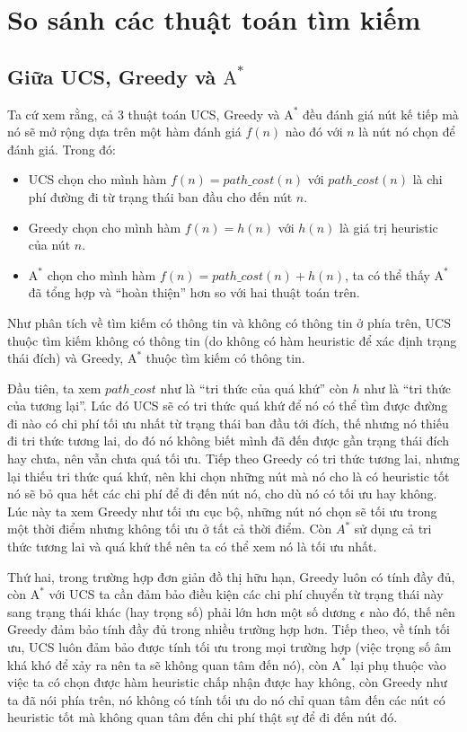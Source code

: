 \chapter{So sánh các thuật toán tìm kiếm}

\section{Giữa UCS, Greedy và $\text{A}^*$}

Ta cứ xem rằng, cả 3 thuật toán UCS, Greedy và $\text{A}^*$ đều đánh giá nút kế tiếp mà nó sẽ mở rộng dựa trên một hàm đánh giá $f(n)$ nào đó với $n$ là nút nó chọn để đánh giá. Trong đó:
\begin{itemize}
    \item UCS chọn cho mình hàm $f(n) = path\_cost(n)$ với $path\_cost(n)$ là chi phí đường đi từ trạng thái ban đầu cho đến nút $n$.
    \item Greedy chọn cho mình hàm $f(n) = h(n)$ với $h(n)$ là giá trị heuristic của nút $n$.
    \item $\text{A}^*$ chọn cho mình hàm $f(n) = path\_cost(n) + h(n)$, ta có thể thấy $\text{A}^*$ đã tổng hợp và ``hoàn thiện'' hơn so với hai thuật toán trên.
\end{itemize}

Như phân tích về tìm kiếm có thông tin và không có thông tin ở phía trên, UCS thuộc tìm kiếm không có thông tin (do không có hàm heuristic để xác định trạng thái đích) và Greedy, $\text{A}^*$ thuộc tìm kiếm có thông tin.
\vspace{7pt}

Đầu tiên, ta xem $path\_cost$ như là ``tri thức của quá khứ'' còn $h$ như là ``tri thức của tương lại''. Lúc đó UCS sẽ có tri thức quá khứ để nó có thể tìm được đường đi nào có chi phí tối ưu nhất từ trạng thái ban đầu tới đích, thế nhưng nó thiếu đi tri thức tương lai, do đó nó không biết mình đã đến được gần trạng thái đích hay chưa, nên vẫn chưa quá tối ưu. Tiếp theo Greedy có tri thức tương lai, nhưng lại thiếu tri thức quá khứ, nên khi chọn những nút mà nó cho là có heuristic tốt nó sẽ bỏ qua hết các chi phí để đi đến nút nó, cho dù nó có tối ưu hay không. Lúc này ta xem Greedy như tối ưu cục bộ, những nút nó chọn sẽ tối ưu trong một thời điểm nhưng không tối ưu ở tất cả thời điểm. Còn $A^*$ sử dụng cả tri thức tương lai và quá khứ thế nên ta có thể xem nó là tối ưu nhất.
\vspace{7pt}

Thứ hai, trong trường hợp đơn giản đồ thị hữu hạn, Greedy luôn có tính đầy đủ, còn $\text{A}^*$ với UCS ta cần đảm bảo điều kiện các chi phí chuyển từ trạng thái này sang trạng thái khác (hay trọng số) phải lớn hơn một số dương $\epsilon$ nào đó, thế nên Greedy đảm bảo tính đầy đủ trong nhiều trường hợp hơn. Tiếp theo, về tính tối ưu, UCS luôn đảm bảo được tính tối ưu trong mọi trường hợp (việc trọng số âm khá khó để xảy ra nên ta sẽ không quan tâm đến nó), còn $\text{A}^*$ lại phụ thuộc vào việc ta có chọn được hàm heuristic chấp nhận được hay không, còn Greedy như ta đã nói phía trên, nó không có tính tối ưu do nó chỉ quan tâm đến các nút có heuristic tốt mà không quan tâm đến chi phí thật sự để đi đến nút đó.
\vspace{7pt}

